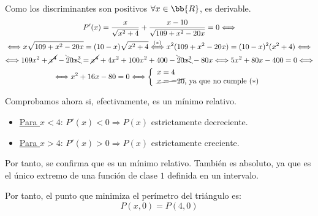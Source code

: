 \documentclass[12pt]{article}
\begin{document}
\begin{ejercicio}
    Como los discriminantes son positivos $\forall x\in \bb{R}$, es derivable.
    \begin{multline*}
        P'(x) = \frac{x}{\sqrt{x^2+4}} +\frac{x-10}{\sqrt{109+x^2-20x}} = 0
        \Longleftrightarrow \\ \Longleftrightarrow 
        x\sqrt{109+x^2-20x} = (10-x)\sqrt{x^2+4}
        \stackrel{(\ast)}{\Longleftrightarrow}
        x^2(109+x^2-20x) = (10-x)^2(x^2+4)
        \Longleftrightarrow  \\ \Longleftrightarrow 
        109x^2+\cancel{x^4}-\bcancel{20x^3} = \cancel{x^4}+4x^2+100x^2+400-\bcancel{20x^3}-80x \Longleftrightarrow 5x^2+80x-400 = 0 
        \Longleftrightarrow \\ \Longleftrightarrow
        x^2+16x-80=0 \Longleftrightarrow \left\{\begin{array}{l}
             x=4 \\
             \cancel{x=-20} \text{, ya que no cumple $(\ast)$}
        \end{array} \right.
    \end{multline*}

    Comprobamos ahora si, efectivamente, es un mínimo relativo.
    \begin{itemize}
        \item \underline{Para $x<4$}: $P'(x)<0 \Longrightarrow P(x)$ estrictamente decreciente.
        \item \underline{Para $x>4$}: $P'(x)>0 \Longrightarrow P(x)$ estrictamente creciente.
    \end{itemize}

    Por tanto, se confirma que es un mínimo relativo. También es absoluto, ya que es el único extremo de una función de clase $1$ definida en un intervalo.

    Por tanto, el punto que minimiza el perímetro del triángulo es:
    \begin{equation*}
        P(x,0) = P(4,0)
    \end{equation*}
    
\end{ejercicio}
\end{document}
